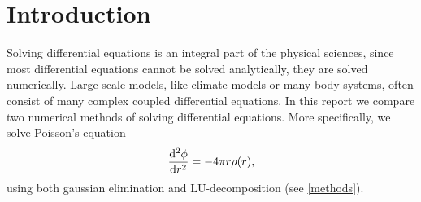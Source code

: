 \section{Introduction}

Solving differential equations is an integral part of the physical sciences,
since most differential equations cannot be solved analytically, they are solved
numerically. Large scale models, like climate models or many-body systems, often
consist of many complex coupled differential equations. 
In this report we compare two numerical methods of solving differential
equations. More specifically, we solve Poisson's equation
  \begin{equation}
    \dv[2]{\phi}{r} = -4\pi r \rho (r),
  \end{equation}
using both gaussian elimination and LU-decomposition (see \cref{methods}).
